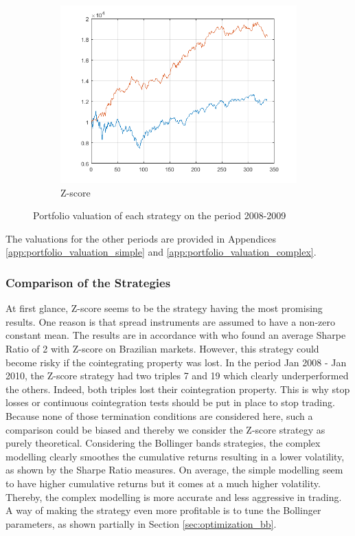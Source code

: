 \documentclass[11pt,a4,twosided,singlespacing,titlepagenumber=on]{scrreprt}
\numberwithin{equation}{chapter} %
\theoremstyle{remark}
\begin{document}
\begin{figure}[H]
\begin{subfigure}[t]{0.32\textwidth}
        \includegraphics[width=1\textwidth]{res/strats/zscore}
        \caption{Z-score}
    \end{subfigure}
    \caption{Portfolio valuation of each strategy on the period 2008-2009}
    \label{fig:portfolio_valuations}
\end{figure}

The valuations for the other periods are provided in Appendices \ref{app:portfolio_valuation_simple} and \ref{app:portfolio_valuation_complex}.

\subsubsection{Comparison of the Strategies}
At first glance, Z-score seems to be the strategy having the most promising results. One reason is that spread instruments are assumed to have a non-zero constant mean. The results are in accordance with \cite{caldeira2013} who found an average Sharpe Ratio of 2 with Z-score on Brazilian markets. However, this strategy could become risky if the cointegrating property was lost. In the period Jan 2008 - Jan 2010, the Z-score strategy had two triples 7 and 19 which clearly underperformed the others. Indeed, both triples lost their cointegration property. This is why stop losses or continuous cointegration tests should be put in place to stop trading. Because none of those termination conditions are considered here, such a comparison could be biased and thereby we consider the Z-score strategy as purely theoretical. Considering the Bollinger bands strategies, the complex modelling clearly smoothes the cumulative returns resulting in a lower volatility, as shown by the Sharpe Ratio measures. On average, the simple modelling seem to have higher cumulative returns but it comes at a much higher volatility. Thereby, the complex modelling is more accurate and less aggressive in trading. A way of making the strategy even more profitable is to tune the Bollinger parameters, as shown partially in  Section \ref{sec:optimization_bb}.
\end{document}
